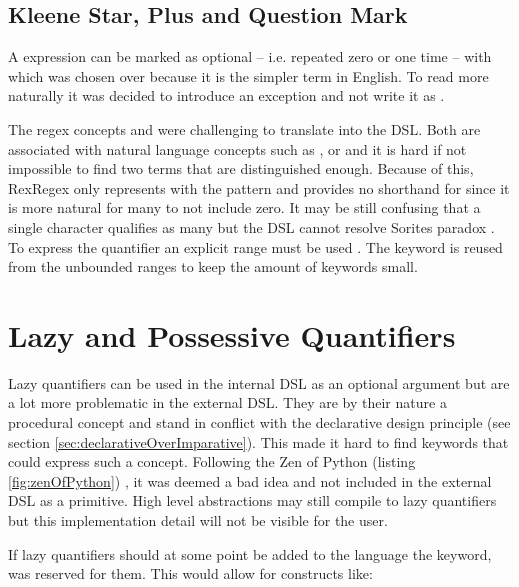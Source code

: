 \subsection{Kleene Star, Plus and Question Mark}

A expression can be marked as optional -- i.e. repeated zero or one time -- with  which was chosen over  because it is the simpler term in English. To read more naturally it was decided to introduce an exception and not write it as .

The regex concepts \pattern{\placeholder *} and \pattern{\placeholder +} were challenging to translate into the DSL. Both are associated with natural language concepts such as ,  or  and it is hard if not impossible to find two terms that are distinguished enough. Because of this, RexRegex only represents \pattern{+} with the  pattern and provides no shorthand for \pattern{*} since it is more natural for many to not include zero. It may be still confusing that a single character qualifies as many but the DSL cannot resolve Sorites paradox \cite{SoritesParadox}. To express the \pattern{*} quantifier an explicit range must be used . The  keyword is reused from the unbounded ranges to keep the amount of keywords small.

\section{Lazy and Possessive Quantifiers}

Lazy quantifiers can be used in the internal DSL as an optional argument  but are a lot more problematic in the external DSL. They are by their nature a procedural concept and stand in conflict with the declarative design principle (see section \ref{sec:declarativeOverImparative}). This made it hard to find keywords that could express such a concept. Following the Zen of Python (listing \ref{fig:zenOfPython}) , it was deemed a bad idea and not included in the external DSL as a primitive. High level abstractions may still compile to lazy quantifiers but this implementation detail will not be visible for the user.

If lazy quantifiers should at some point be added to the language the  keyword, was reserved for them. This would allow for constructs like: 

